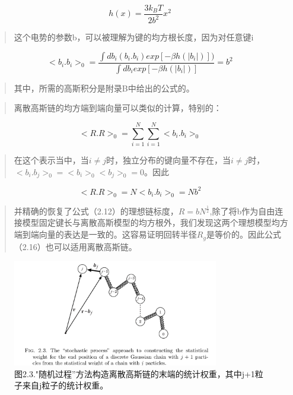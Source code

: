 			\begin{equation}
			h(x)=\frac{3k_{B}T}{2b^2} x^2  
			\end{equation}
			\begin{quotation}
				这个电势的参数b，可以被理解为键的均方根长度，因为对任意键i 
			\end{quotation}
			\begin{equation}
			<b_{i}.b_{i}>_{0}= \frac{\int db_{i}(b_{i}.b_{i})exp[-\beta h(|b_{i}|)])}{\int db_{i}exp[-\beta h(|b_{i}|)]}=b^2
			\end{equation}
			\begin{quotation}
				其中，所需的高斯积分是附录B中给出的公式的。
			\end{quotation}
			\begin{quotation}
				离散高斯链的均方端到端向量可以类似的计算，特别的：
			\end{quotation}
			\begin{equation}
			<R.R>_{0}=\sum_{i=1}^{N}\sum_{i=1}^{N}<b_{i}.b_{i}>_{0}
			\end{equation}
			\begin{quotation}
				在这个表示当中，当$i\neq j$时，独立分布的键向量不存在，当$i\neq j$时，$<b_{i}.b_{j}>_{0}=<b_{i}>_{0}<b_{j}>_{0}=0$。因此
			\end{quotation}
			\begin{equation}
			<R.R>_{0}=N<b_{i}.b_{i}>_{0}=Nb^2
			\end{equation}
			\begin{quotation}
				并精确的恢复了公式（2.12）的理想链标度，$R=bN^\frac{1}{2}$,除了将b作为自由连接模型固定键长与离散高斯模型的均方根外，我们发现这两个理想模型均方端到端向量的表达是一致的。这容易证明回转半径$R_{g}$是等价的。因此公式（2.16）也可以适用离散高斯链。
			\end{quotation}
			\begin{figure}
				\caption{图2.3."随机过程”方法构造离散高斯链的末端的统计权重，其中j+1粒子来自j粒子的统计权重。}
				\centering
				\includegraphics[width=9cm]{./figures/1.png}
			\end{figure}
